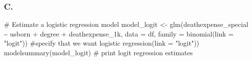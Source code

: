 \documentclass[
  letterpaper,
  DIV=11,
  numbers=noendperiod]{scrartcl}
\newenvironment{Shaded}{\begin{snugshade}}{\end{snugshade}}
\newcommand{\AttributeTok}[1]{\textcolor[rgb]{0.40,0.45,0.13}{#1}}
\newcommand{\CommentTok}[1]{\textcolor[rgb]{0.37,0.37,0.37}{#1}}
\newcommand{\FunctionTok}[1]{\textcolor[rgb]{0.28,0.35,0.67}{#1}}
\newcommand{\NormalTok}[1]{\textcolor[rgb]{0.00,0.23,0.31}{#1}}
\newcommand{\OtherTok}[1]{\textcolor[rgb]{0.00,0.23,0.31}{#1}}
\newcommand{\SpecialCharTok}[1]{\textcolor[rgb]{0.37,0.37,0.37}{#1}}
\newcommand{\StringTok}[1]{\textcolor[rgb]{0.13,0.47,0.30}{#1}}
\begin{document}
\subsubsection{C.}\label{c.}

\begin{Shaded}
\begin{Highlighting}[]
\CommentTok{\# Estimate a logistic regression model}
\NormalTok{model\_logit }\OtherTok{\textless{}{-}} \FunctionTok{glm}\NormalTok{(deathexpense\_special }\SpecialCharTok{\textasciitilde{}}\NormalTok{ usborn }\SpecialCharTok{+}\NormalTok{ degree }\SpecialCharTok{+}\NormalTok{ deathexpense\_1k, }
  \AttributeTok{data =}\NormalTok{ df, }
  \AttributeTok{family =} \FunctionTok{binomial}\NormalTok{(}\AttributeTok{link =} \StringTok{"logit"}\NormalTok{)) }\CommentTok{\#specify that we want logistic regression(link = "logit")) }
\FunctionTok{modelsummary}\NormalTok{(model\_logit) }\CommentTok{\# print logit regression estimates}
\end{Highlighting}
\end{Shaded}
\end{document}
